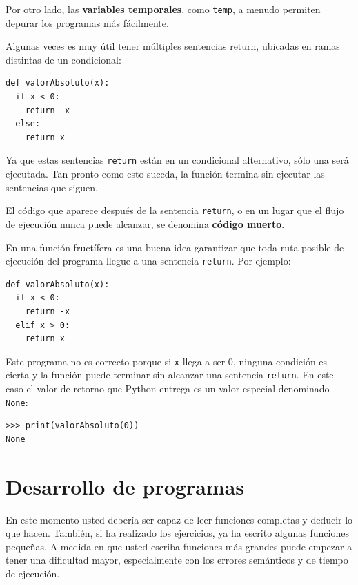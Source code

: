 Por otro lado, las \textbf{variables temporales}, como \texttt{temp},
a menudo permiten depurar los programas más fácilmente.

 

Algunas veces es muy útil tener múltiples sentencias return, ubicadas
en ramas distintas de un condicional:

\begin{verbatim}
def valorAbsoluto(x):
  if x < 0:
    return -x
  else:
    return x
\end{verbatim}

Ya que estas sentencias \texttt{return} están en un condicional alternativo,
sólo una será ejecutada. Tan pronto como esto suceda, la función termina
sin ejecutar las sentencias que siguen.

El código que aparece después de la sentencia \texttt{return}, o en
un lugar que el flujo de ejecución nunca puede alcanzar, se denomina
\textbf{código muerto}.


En una función fructífera es una buena idea garantizar que toda ruta
posible de ejecución del programa llegue a una sentencia \texttt{return}.
Por ejemplo:

\begin{verbatim}
def valorAbsoluto(x):
  if x < 0:
    return -x
  elif x > 0:
    return x
\end{verbatim}
 Este programa no es correcto porque si \texttt{x} llega a ser 0,
ninguna condición es cierta y la función puede terminar sin alcanzar
una sentencia \texttt{return}. En este caso el valor de retorno que
Python entrega es un valor especial denominado \texttt{None}:

\begin{verbatim}
>>> print(valorAbsoluto(0))
None
\end{verbatim}

\section{Desarrollo de programas}

\label{program development} 

En este momento usted debería ser capaz de leer funciones completas
y deducir lo que hacen. También, si ha realizado los ejercicios, ya
ha escrito algunas funciones pequeñas. A medida en que usted escriba
funciones más grandes puede empezar a tener una dificultad mayor,
especialmente con los errores semánticos y de tiempo de ejecución.

